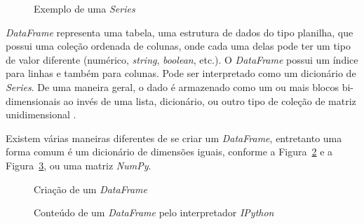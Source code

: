 \begin{figure}[h!]
	\centering
	\caption{Exemplo de uma \textit{Series}}
	\vspace{-0.3cm}
	\label{pandas-series}
\end{figure}

\textit{DataFrame} representa uma tabela, uma estrutura de dados do tipo planilha, que possui uma coleção ordenada de colunas, onde cada uma delas pode ter um tipo de valor diferente (numérico, \textit{string}, \textit{boolean}, etc.). O \textit{DataFrame} possui um índice para linhas e também para colunas. Pode ser interpretado como um dicionário de \textit{Series}. De uma maneira geral, o dado é armazenado como um ou mais blocos bi-dimensionais ao invés de uma lista, dicionário, ou outro tipo de coleção de matriz unidimensional \cite{python-analysis}.

Existem várias maneiras diferentes de se criar um \textit{DataFrame}, entretanto uma forma comum é um dicionário de dimensões iguais, conforme a Figura~\ref{pandas-dataframe} e a Figura~\ref{pandas-dataframe2}, ou uma matriz \textit{NumPy}.

\begin{figure}[h!]
	\centering
	\caption{Criação de um \textit{DataFrame}}
	\vspace{-0.3cm}
	\label{pandas-dataframe}
\end{figure}

\begin{figure}[h!]
	\centering
	\caption{Conteúdo de um \textit{DataFrame} pelo interpretador \textit{IPython}}
	\vspace{-0.3cm}
	\label{pandas-dataframe2}
\end{figure}

